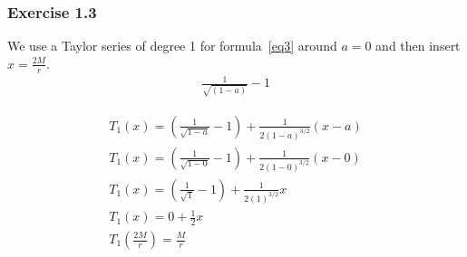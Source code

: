 \documentclass[reprint,english,notitlepage]{revtex4-2}
\begin{document}
        \subsubsection{Exercise 1.3}\label{subsec:exercise-1.3}
            We use a Taylor series of degree 1 for formula~\eqref{eq3} around $a = 0$ and then insert $x = \frac{2M}{r}$.
            \begin{align}
                \frac{1}{\sqrt{\left(1-a \right)}}-1 \label{eq3}
            \end{align}

            \begin{align}
                T_1(x) = \left(\frac{1}{\sqrt{1-a}}-1 \right) + \frac{1}{2(1-a)^{3/2}}(x-a)\\
                T_1(x) = \left(\frac{1}{\sqrt{1-0}}-1 \right) + \frac{1}{2(1-0)^{3/2}}(x-0)\\
                T_1(x) = \left(\frac{1}{\sqrt{1}}-1 \right) + \frac{1}{2(1)^{3/2}}x\\
                T_1(x) = 0 + \frac{1}{2}x\\
                T_1\left(\frac{2M}{r}\right) = \frac{M}{r}
            \end{align}
\clearpage
\newpage
\printbibliography
\end{document}
